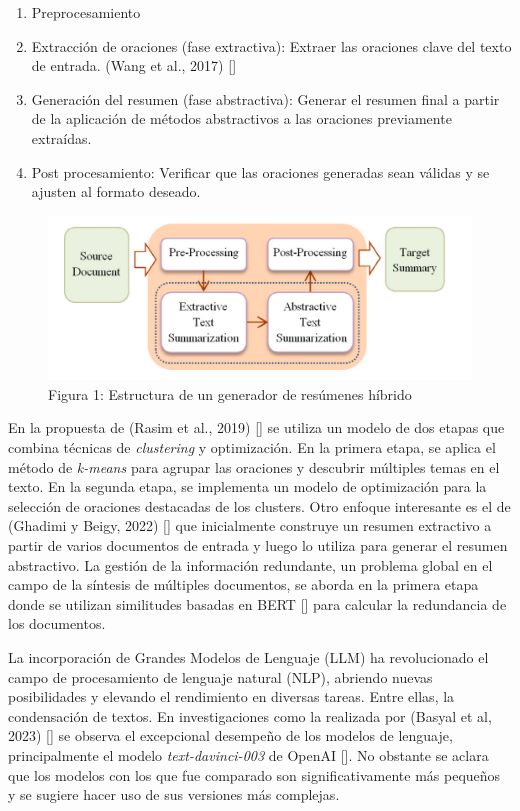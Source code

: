 \begin{enumerate}
    \item Preprocesamiento
    \item Extracción de oraciones (fase extractiva): Extraer las oraciones clave del texto de entrada. (Wang et al., 2017) [\cite{Wang}]
    \item Generación del resumen (fase abstractiva): Generar el resumen final a partir de la aplicación de métodos abstractivos a las oraciones previamente extraídas.
    \item Post procesamiento: Verificar que las oraciones generadas sean válidas y se ajusten al formato deseado.
\end{enumerate}

\begin{figure}[H]    
    \centering
    \includegraphics[scale = 1]{Figures/hybrid.png}
    \caption*{Figura 1: Estructura de un generador de resúmenes híbrido}
\end{figure}

En la propuesta de (Rasim et al., 2019) [\cite{cosum}] se utiliza un modelo de dos etapas que combina técnicas de \emph{clustering} y optimización. En la primera etapa, se aplica el método de \emph{k-means} para agrupar las oraciones y descubrir múltiples temas en el texto. En la segunda etapa, se implementa un modelo de optimización para la selección de oraciones destacadas de los clusters. Otro enfoque interesante es el de (Ghadimi y Beigy, 2022) [\cite{hybrid-llm}] que inicialmente construye un resumen extractivo a partir de varios documentos de entrada y luego lo utiliza para generar el resumen abstractivo. La gestión de la información redundante, un problema global en el campo de la síntesis de múltiples documentos, se aborda en la primera etapa donde se utilizan similitudes basadas en BERT [\cite{BERT}] para calcular la redundancia de los documentos.

La incorporación de Grandes Modelos de Lenguaje (LLM) ha revolucionado el campo de procesamiento de lenguaje natural (NLP), abriendo nuevas posibilidades y elevando el rendimiento en diversas tareas. Entre ellas, la condensación de textos. En investigaciones como la realizada por (Basyal et al, 2023) [\cite{basyal2023text}] se observa el excepcional desempeño de los modelos de lenguaje, principalmente el modelo \emph{text-davinci-003} de OpenAI [\cite{openai}]. No obstante se aclara que los modelos con los que fue comparado son significativamente más peque\~nos y se sugiere hacer uso de sus versiones más complejas.

